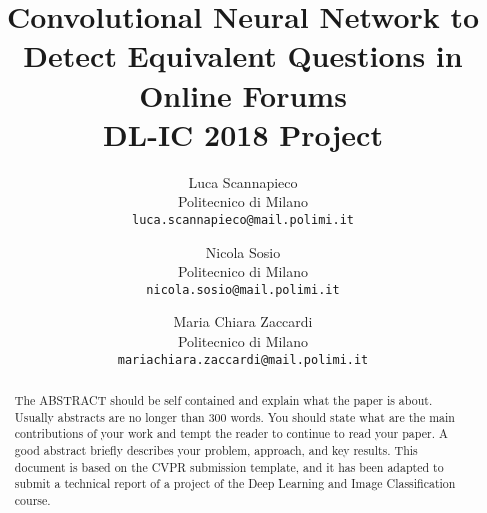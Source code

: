 \documentclass[10pt,twocolumn,letterpaper]{article}
\begin{document}
\title{Convolutional Neural Network to Detect Equivalent Questions in Online Forums  \\ DL-IC 2018 Project} 

\author{Luca Scannapieco\\
Politecnico di Milano\\
{\tt\small luca.scannapieco@mail.polimi.it}
\and
Nicola Sosio\\
Politecnico di Milano\\
{\tt\small nicola.sosio@mail.polimi.it}
\and
Maria Chiara Zaccardi\\
Politecnico di Milano\\
{\tt\small mariachiara.zaccardi@mail.polimi.it}
}

\maketitle

\begin{abstract}
   The ABSTRACT should be self contained and explain what the paper is about. Usually abstracts are no longer than 300 words. You should state what are the main contributions of your work and tempt the reader to continue to read your paper. A good abstract briefly describes your problem, approach, and key results. This document is based on the CVPR submission template, and it has been adapted to submit a technical report of a project of the Deep Learning and Image Classification course.
\end{abstract}

\end{document}
